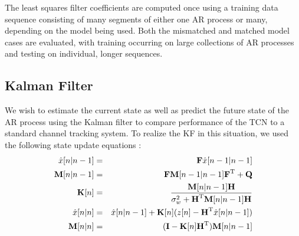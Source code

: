 \documentclass[twocolumn,letterpaper]{IEEEAerospaceCLS}  %
\begin{document}
The least squares filter coefficients are computed once using a training data sequence consisting of many segments of either one AR process or many, depending on the model being used. Both the mismatched and matched model cases are evaluated, with training occurring on large collections of AR processes and testing on individual, longer sequences. 


\subsection{Kalman Filter}

 We wish to estimate the current state as well as predict the future state of the AR process using the Kalman filter to compare performance of the TCN to a standard channel tracking system. To realize the KF in this situation, we used the following state update equations \cite{kay1993fundamentals}: \\
\begin{eqnarray*}
\hat{x}[n|n-1]&=&\textbf{F}\hat{x}[n-1|n-1] \\
\textbf{M}[n|n-1]&=&\textbf{FM}[n-1|n-1]\textbf{F}^{\rm T} + \textbf{Q} \\
\textbf{K}[n]&=&\frac{\textbf{M}[n|n-1]\textbf{H}}{\sigma_{w}^{2} + \textbf{H}^{\rm T}\textbf{M}[n|n-1]\textbf{H}} \\
\hat{x}[n|n]&=&\hat{x}[n|n-1] + \textbf{K}[n](z[n]-\textbf{H}^{\rm T}\hat{x}[n|n-1]) \\
\textbf{M}[n|n]&=&(\textbf{I}-\textbf{K}[n]\textbf{H}^{\rm T})\textbf{M}[n|n-1]
\end{eqnarray*}
\end{document}
